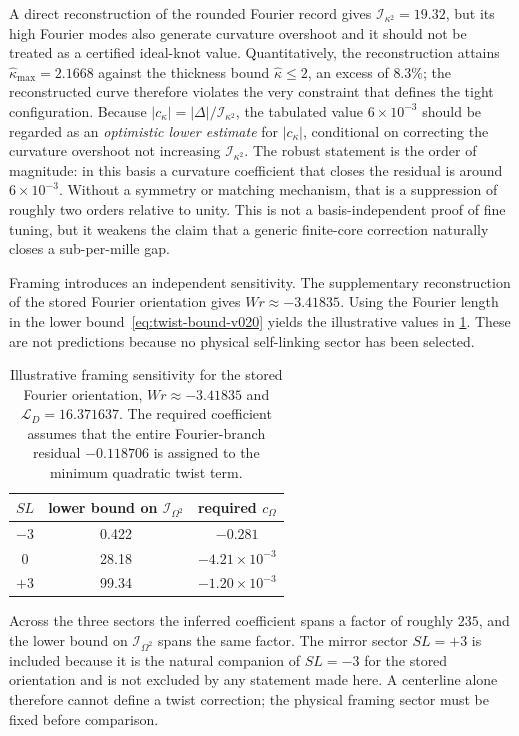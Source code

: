 \documentclass[aps,pre,preprint,notitlepage,nofootinbib,superscriptaddress]{revtex4-2}
\newcommand{\calL}{\mathcal L}
\newcommand{\calI}{\mathcal I}
\begin{document}
A direct reconstruction of the rounded Fourier record gives $\calI_{\kappa^2}=19.32$, but its high Fourier modes also generate curvature overshoot and it should not be treated as a certified ideal-knot value.  Quantitatively, the reconstruction attains $\hat\kappa_{\max}=2.1668$ against the thickness bound $\hat\kappa\le2$, an excess of $8.3\%$; the reconstructed curve therefore violates the very constraint that defines the tight configuration.  Because $|c_\kappa|=|\Delta|/\calI_{\kappa^2}$, the tabulated value $6\times10^{-3}$ should be regarded as an \emph{optimistic lower estimate} for $|c_\kappa|$, conditional on correcting the curvature overshoot not increasing $\calI_{\kappa^2}$.  The robust statement is the order of magnitude: in this basis a curvature coefficient that closes the residual is around $6\times10^{-3}$.  Without a symmetry or matching mechanism, that is a suppression of roughly two orders relative to unity.  This is not a basis-independent proof of fine tuning, but it weakens the claim that a generic finite-core correction naturally closes a sub-per-mille gap.

Framing introduces an independent sensitivity.  The supplementary reconstruction of the stored Fourier orientation gives $Wr\approx-3.41835$.  Using the Fourier length in the lower bound~\eqref{eq:twist-bound-v020} yields the illustrative values in \cref{tab:framing-sensitivity}.  These are not predictions because no physical self-linking sector has been selected.

\begin{table}[t]
\caption{Illustrative framing sensitivity for the stored Fourier orientation, $Wr\approx-3.41835$ and $\calL_D=16.371637$.  The required coefficient assumes that the entire Fourier-branch residual $-0.118706$ is assigned to the minimum quadratic twist term.}
\label{tab:framing-sensitivity}
\begin{ruledtabular}
\begin{tabular}{ccc}
$SL$ & lower bound on $\calI_{\Omega^2}$ & required $c_\Omega$\\
\hline
$-3$ & 0.422 & $-0.281$\\
$0$  & 28.18 & $-4.21\times10^{-3}$\\
$+3$ & 99.34 & $-1.20\times10^{-3}$\\
\end{tabular}
\end{ruledtabular}
\end{table}

Across the three sectors the inferred coefficient spans a factor of roughly $235$, and the lower bound on $\calI_{\Omega^2}$ spans the same factor.  The mirror sector $SL=+3$ is included because it is the natural companion of $SL=-3$ for the stored orientation and is not excluded by any statement made here.  A centerline alone therefore cannot define a twist correction; the physical framing sector must be fixed before comparison.
\end{document}
